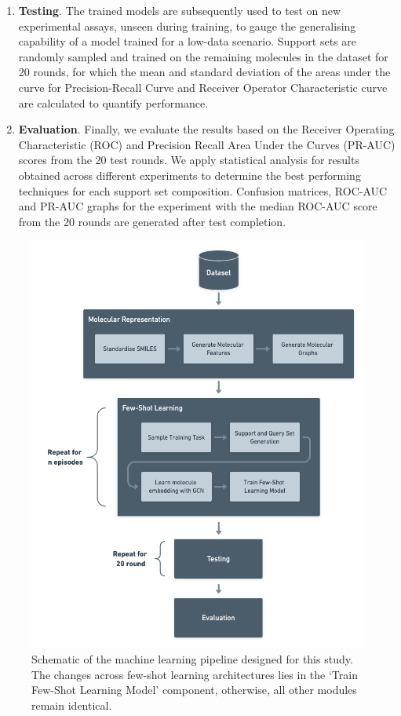 \begin{enumerate}
	\item \textbf{Testing}. The trained models are subsequently used to test on new experimental assays, unseen during training, to gauge the generalising capability of a model trained for a low-data scenario. Support sets are randomly sampled and trained on the remaining molecules in the dataset for 20 rounds, for which the mean and standard deviation of the areas under the curve for Precision-Recall Curve and Receiver Operator Characteristic curve are calculated to quantify performance.

	\item \textbf{Evaluation}. Finally, we evaluate the results based on the Receiver Operating Characteristic (ROC) and Precision Recall Area Under the Curves (PR-AUC) scores from the 20 test rounds. We apply statistical analysis for results obtained across different experiments to determine the best performing techniques for each support set composition. Confusion matrices, ROC-AUC and PR-AUC graphs for the experiment with the median ROC-AUC score from the 20 rounds are generated after test completion.
\end{enumerate}

\begin{figure}[!ht]
	\centering
	\includegraphics[width=0.9\linewidth]{img/architecture-schematic.png}
	\caption[Schematic of the major parts in our architecture]{Schematic of the machine learning pipeline designed for this study. The changes across few-shot learning architectures lies in the `Train Few-Shot Learning Model' component, otherwise, all other modules remain identical.}
	\label{fig:architecture-schematic}
\end{figure}

